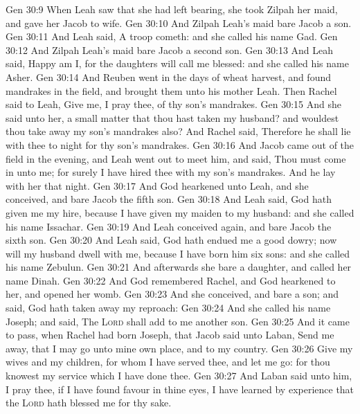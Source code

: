 \vs Gen 30:9 When Leah saw that she had left bearing, she took Zilpah her maid, and gave her Jacob to wife.
\vs Gen 30:10 And Zilpah Leah's maid bare Jacob a son.
\vs Gen 30:11 And Leah said, A troop cometh: and she called his name Gad.
\vs Gen 30:12 And Zilpah Leah's maid bare Jacob a second son.
\vs Gen 30:13 And Leah said, Happy am I, for the daughters will call me blessed: and she called his name Asher.
\vs Gen 30:14 And Reuben went in the days of wheat harvest, and found mandrakes in the field, and brought them unto his mother Leah. Then Rachel said to Leah, Give me, I pray thee, of thy son's mandrakes.
\vs Gen 30:15 And she said unto her,  a small matter that thou hast taken my husband? and wouldest thou take away my son's mandrakes also? And Rachel said, Therefore he shall lie with thee to night for thy son's mandrakes.
\vs Gen 30:16 And Jacob came out of the field in the evening, and Leah went out to meet him, and said, Thou must come in unto me; for surely I have hired thee with my son's mandrakes. And he lay with her that night.
\vs Gen 30:17 And God hearkened unto Leah, and she conceived, and bare Jacob the fifth son.
\vs Gen 30:18 And Leah said, God hath given me my hire, because I have given my maiden to my husband: and she called his name Issachar.
\vs Gen 30:19 And Leah conceived again, and bare Jacob the sixth son.
\vs Gen 30:20 And Leah said, God hath endued me  a good dowry; now will my husband dwell with me, because I have born him six sons: and she called his name Zebulun.
\vs Gen 30:21 And afterwards she bare a daughter, and called her name Dinah.
\vs Gen 30:22 And God remembered Rachel, and God hearkened to her, and opened her womb.
\vs Gen 30:23 And she conceived, and bare a son; and said, God hath taken away my reproach:
\vs Gen 30:24 And she called his name Joseph; and said, The \textsc{Lord} shall add to me another son.
\vs Gen 30:25 And it came to pass, when Rachel had born Joseph, that Jacob said unto Laban, Send me away, that I may go unto mine own place, and to my country.
\vs Gen 30:26 Give  my wives and my children, for whom I have served thee, and let me go: for thou knowest my service which I have done thee.
\vs Gen 30:27 And Laban said unto him, I pray thee, if I have found favour in thine eyes,  I have learned by experience that the \textsc{Lord} hath blessed me for thy sake.
